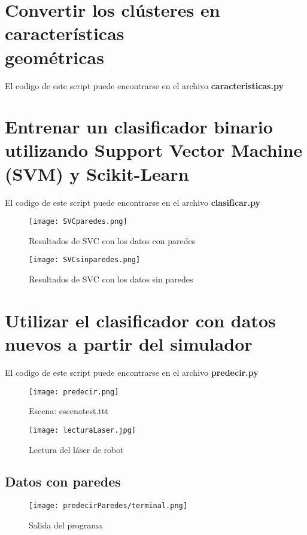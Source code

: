 \section{Convertir los clústeres en características \\ geométricas}

El codigo de este script puede encontrarse en el archivo \textbf{caracteristicas.py}

\section{Entrenar un clasificador binario utilizando Support Vector Machine (SVM) y Scikit-Learn}

El codigo de este script puede encontrarse en el archivo \textbf{clasificar.py}

\begin{figure}[H]
	\centering
	\texttt{[image: SVCparedes.png]}
	\caption{Resultados de SVC con los datos con paredes}
\end{figure}

\begin{figure}[H]
	\centering
	\texttt{[image: SVCsinparedes.png]}
	\caption{Resultados de SVC con los datos sin paredes}
\end{figure}

\section{Utilizar el clasificador con datos nuevos a partir del simulador}

El codigo de este script puede encontrarse en el archivo \textbf{predecir.py}

\begin{figure}[H]
	\centering
	\texttt{[image: predecir.png]}
	\caption{Escena: escenatest.ttt}
\end{figure}

\begin{figure}[H]
	\centering
	\texttt{[image: lecturaLaser.jpg]}
	\caption{Lectura del láser de robot}
\end{figure}

\subsection{Datos con paredes}
\begin{figure}[H]
	\centering
	\texttt{[image: predecirParedes/terminal.png]}
	\caption{Salida del programa}
\end{figure}

